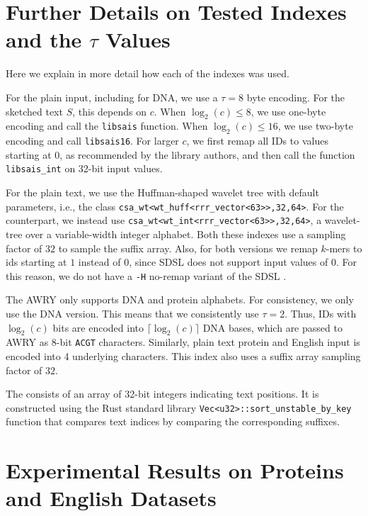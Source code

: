 \section{Further Details on Tested Indexes and the $\tau$ Values}\label{sec:app-tau}

Here we explain in more detail how each of the indexes was used.

For the plain input, including for DNA, we use a $\tau=8$ byte encoding.
For the sketched text $S$, this depends on $c$. When $\log_2(c)\leq 8$, we use one-byte
encoding and call the \texttt{libsais} function. When $\log_2(c)\leq 16$, we use
two-byte encoding and call \texttt{libsais16}. For larger $c$, we first remap
all IDs to values starting at $0$, as recommended by the library authors, and then call the function \texttt{libsais\_int} on 32-bit
input values.

For the plain text, we use the Huffman-shaped wavelet tree with default parameters, i.e., the class
\verb|csa_wt<wt_huff<rrr_vector<63>>,32,64>|.
For the {\uindex} counterpart, we instead use
\verb|csa_wt<wt_int<rrr_vector<63>>,32,64>|, a wavelet-tree over a variable-width integer alphabet.
Both these indexes use a sampling factor of
$32$ to sample the suffix array. Also, for both versions we remap
$k$-mers to ids starting at $1$ instead of $0$, since SDSL does not support input values of $0$.
For this reason, we do not have a \texttt{-H} no-remap variant of the SDSL {\fmindex}.

The AWRY {\fmindex} only supports DNA and protein alphabets. For consistency, we
only use the DNA version. This means that we consistently use $\tau=2$. Thus,
IDs with $\log_2(c)$ bits are encoded into $\lceil\log_2(c)\rceil$ DNA bases,
which are passed to AWRY as 8-bit \texttt{ACGT} characters. Similarly, plain
text protein and English input is encoded into 4 underlying characters.
This index also uses a suffix array sampling factor of $32$.

The \sindex consists of an array of 32-bit integers indicating text positions.
It is constructed using the Rust standard library
\verb|Vec<u32>::sort_unstable_by_key| function that compares text indices
by comparing the corresponding suffixes.

\clearpage
\section{Experimental Results on Proteins and English Datasets}\label{sec:app}

